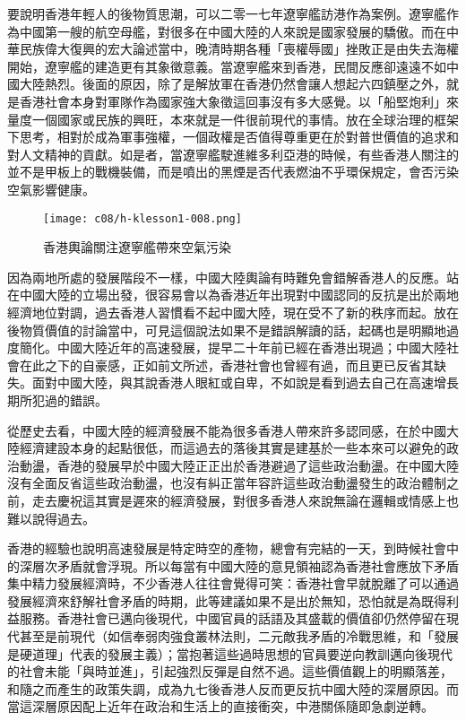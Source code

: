 要說明香港年輕人的後物質思潮，可以二零一七年遼寧艦訪港作為案例。遼寧艦作為中國第一艘的航空母艦，對很多在中國大陸的人來說是國家發展的驕傲。而在中華民族偉大復興的宏大論述當中，晚清時期各種「喪權辱國」挫敗正是由失去海權開始，遼寧艦的建造更有其象徵意義。當遼寧艦來到香港，民間反應卻遠遠不如中國大陸熱烈。後面的原因，除了是解放軍在香港仍然會讓人想起六四鎮壓之外，就是香港社會本身對軍隊作為國家強大象徵這回事沒有多大感覺。以「船堅炮利」來量度一個國家或民族的興旺，本來就是一件很前現代的事情。放在全球治理的框架下思考，相對於成為軍事強權，一個政權是否值得尊重更在於對普世價值的追求和對人文精神的貢獻。如是者，當遼寧艦駛進維多利亞港的時候，有些香港人關注的並不是甲板上的戰機裝備，而是噴出的黑煙是否代表燃油不乎環保規定，會否污染空氣影響健康。

\begin{figure}[htbp]
    \centering
    \texttt{[image: c08/h-klesson1-008.png]}
    \caption{香港輿論關注遼寧艦帶來空氣污染} 
\end{figure}

因為兩地所處的發展階段不一樣，中國大陸輿論有時難免會錯解香港人的反應。站在中國大陸的立場出發，很容易會以為香港近年出現對中國認同的反抗是出於兩地經濟地位對調，過去香港人習慣看不起中國大陸，現在受不了新的秩序而起。放在後物質價值的討論當中，可見這個說法如果不是錯誤解讀的話，起碼也是明顯地過度簡化。中國大陸近年的高速發展，提早二十年前已經在香港出現過；中國大陸社會在此之下的自豪感，正如前文所述，香港社會也曾經有過，而且更已反省其缺失。面對中國大陸，與其說香港人眼紅或自卑，不如說是看到過去自己在高速增長期所犯過的錯誤。

從歷史去看，中國大陸的經濟發展不能為很多香港人帶來許多認同感，在於中國大陸經濟建設本身的起點很低，而這過去的落後其實是建基於一些本來可以避免的政治動盪，香港的發展早於中國大陸正正出於香港避過了這些政治動盪。在中國大陸沒有全面反省這些政治動盪，也沒有糾正當年容許這些政治動盪發生的政治體制之前，走去慶祝這其實是遲來的經濟發展，對很多香港人來說無論在邏輯或情感上也難以說得過去。

香港的經驗也說明高速發展是特定時空的產物，總會有完結的一天，到時候社會中的深層次矛盾就會浮現。所以每當有中國大陸的意見領袖認為香港社會應放下矛盾集中精力發展經濟時，不少香港人往往會覺得可笑：香港社會早就脫離了可以通過發展經濟來舒解社會矛盾的時期，此等建議如果不是出於無知，恐怕就是為既得利益服務。香港社會已邁向後現代，中國官員的話語及其盛載的價值卻仍然停留在現代甚至是前現代（如信奉弱肉強食叢林法則，二元敵我矛盾的冷戰思維，和「發展是硬道理」代表的發展主義）；當抱著這些過時思想的官員要逆向教訓邁向後現代的社會未能「與時並進」，引起強烈反彈是自然不過。這些價值觀上的明顯落差，和隨之而產生的政策失調，成為九七後香港人反而更反抗中國大陸的深層原因。而當這深層原因配上近年在政治和生活上的直接衝突，中港關係隨即急劇逆轉。

